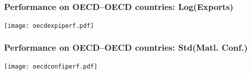 \documentclass[10pt, compress]{beamer}
\begin{document}
\frame
{
  \frametitle{Performance on OECD--OECD countries: Log(Exports)}
  \centering
  \texttt{[image: oecdexpiperf.pdf]}
}

\frame
{
  \frametitle{Performance on OECD--OECD countries: Std(Matl. Conf.)}
  \centering
  \texttt{[image: oecdconfiperf.pdf]}
}

\end{document}
